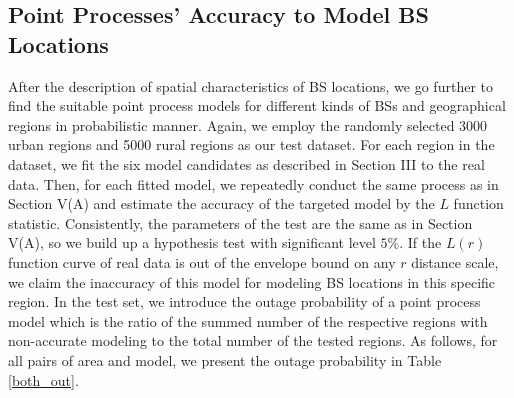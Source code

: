 \subsection*{Point Processes' Accuracy to Model BS Locations}
After the description of spatial characteristics of BS locations, we go further to find the suitable point process models for different kinds of BSs and geographical regions in probabilistic manner. Again, we employ the randomly selected 3000 urban regions and 5000 rural regions as our test dataset. For each region in the dataset, we fit the six model candidates as described in Section III to the real data. Then, for each fitted model, we repeatedly conduct the same process as in Section V(A) and estimate the accuracy of the targeted model by the $L$ function statistic. Consistently, the parameters of the test are the same as in Section V(A), so we build up a hypothesis test with significant level $5\%$. If the $L(r)$ function curve of real data is out of the envelope bound on any $r$ distance scale, we claim the inaccuracy of this model for modeling BS locations in this specific region. In the test set, we introduce the outage probability of a point process model which is the ratio of the summed number of the respective regions with non-accurate modeling to the total number of the tested regions. As follows, for all pairs of area and model, we present the outage probability in Table \ref{both_out}.

